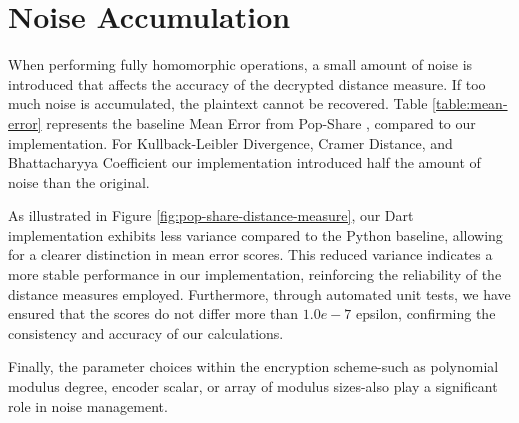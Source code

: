 \section{Noise Accumulation}

When performing fully homomorphic operations, a small amount of noise is introduced that affects the accuracy of the decrypted distance measure. If too much noise is accumulated, the plaintext cannot be recovered. Table \ref{table:mean-error} represents the baseline Mean Error from Pop-Share \cite{Lagesse2021-PopShare}, compared to our implementation. For Kullback-Leibler Divergence, Cramer Distance, and Bhattacharyya Coefficient our implementation introduced half the amount of noise than the original.

As illustrated in Figure \ref{fig:pop-share-distance-measure}, our Dart implementation exhibits less variance compared to the Python baseline, allowing for a clearer distinction in mean error scores. This reduced variance indicates a more stable performance in our implementation, reinforcing the reliability of the distance measures employed. Furthermore, through automated unit tests, we have ensured that the scores do not differ more than $1.0e-7$ epsilon, confirming the consistency and accuracy of our calculations.



Finally, the parameter choices within the encryption scheme-such as polynomial modulus degree, encoder scalar, or array of modulus sizes-also play a significant role in noise management.

